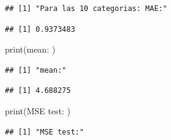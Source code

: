 \documentclass[
]{article}
\newenvironment{Shaded}{\begin{snugshade}}{\end{snugshade}}
\newcommand{\FunctionTok}[1]{\textcolor[rgb]{0.00,0.00,0.00}{#1}}
\newcommand{\NormalTok}[1]{#1}
\newcommand{\SpecialCharTok}[1]{\textcolor[rgb]{0.00,0.00,0.00}{#1}}
\newcommand{\StringTok}[1]{\textcolor[rgb]{0.31,0.60,0.02}{#1}}
\begin{document}
\begin{verbatim}
## [1] "Para las 10 categorias: MAE:"
\end{verbatim}

\begin{Shaded}
\end{Shaded}

\begin{verbatim}
## [1] 0.9373483
\end{verbatim}

\begin{Shaded}
\begin{Highlighting}[]
\FunctionTok{print}\NormalTok{(}\StringTok{\textquotesingle{}mean:\textquotesingle{}}\NormalTok{ )}
\end{Highlighting}
\end{Shaded}

\begin{verbatim}
## [1] "mean:"
\end{verbatim}

\begin{Shaded}
\end{Shaded}

\begin{verbatim}
## [1] 4.688275
\end{verbatim}

\begin{Shaded}
\begin{Highlighting}[]
\FunctionTok{print}\NormalTok{(}\StringTok{\textquotesingle{}MSE test:\textquotesingle{}}\NormalTok{ )}
\end{Highlighting}
\end{Shaded}

\begin{verbatim}
## [1] "MSE test:"
\end{verbatim}

\begin{Shaded}
\end{Shaded}
\end{document}
